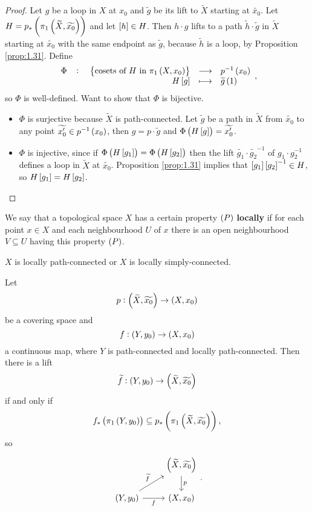 \begin{proof}
Let $ g $ be a loop in $ X $ at $ x_0 $ and $ \widetilde{g} $ be its lift to $ \widetilde{X} $ starting at $ \widetilde{x_0} $. Let $ H = p_*\br{\pi_1\br{\widetilde{X}, \widetilde{x_0}}} $ and let $ \sbr{h} \in H $. Then $ h \cdot g $ lifts to a path $ \widetilde{h} \cdot \widetilde{g} $ in $ \widetilde{X} $ starting at $ \widetilde{x_0} $ with the same endpoint as $ \widetilde{g} $, because $ \widetilde{h} $ is a loop, by Proposition \ref{prop:1.31}. Define
$$ \function[\Phi]{\cbr{\text{cosets of} \ H \ \text{in} \ \pi_1\br{X, x_0}}}{p^{-1}\br{x_0}}{H\sbr{g}}{\widetilde{g}\br{1}}, $$
so $ \Phi $ is well-defined. Want to show that $ \Phi $ is bijective.
\begin{itemize}
\item $ \Phi $ is surjective because $ \widetilde{X} $ is path-connected. Let $ \widetilde{g} $ be a path in $ \widetilde{X} $ from $ \widetilde{x_0} $ to any point $ \widetilde{x_0'} \in p^{-1}\br{x_0} $, then $ g = p \cdot \widetilde{g} $ and $ \Phi\br{H\sbr{g}} = \widetilde{x_0'} $.
\item $ \Phi $ is injective, since if $ \Phi\br{H\sbr{g_1}} = \Phi\br{H\sbr{g_2}} $ then the lift $ \widetilde{g_1} \cdot \widetilde{g_2}^{-1} $ of $ g_1 \cdot g_2^{-1} $ defines a loop in $ \widetilde{X} $ at $ \widetilde{x_0} $. Proposition \ref{prop:1.31} implies that $ \sbr{g_1}\sbr{g_2}^{-1} \in H $, so $ H\sbr{g_1} = H\sbr{g_2} $.
\end{itemize}
\end{proof}

We say that a topological space $ X $ has a certain property $ \br{P} $ \textbf{locally} if for each point $ x \in X $ and each neighbourhood $ U $ of $ x $ there is an open neighbourhood $ V \subseteq U $ having this property $ \br{P} $.

\begin{example*}
$ X $ is locally path-connected or $ X $ is locally simply-connected.
\end{example*}

\begin{proposition}
\label{prop:1.33}
Let
$$ p : \br{\widetilde{X}, \widetilde{x_0}} \to \br{X, x_0} $$
be a covering space and
$$ f : \br{Y, y_0} \to \br{X, x_0} $$
a continuous map, where $ Y $ is path-connected and locally path-connected. Then there is a lift
$$ \widetilde{f} : \br{Y, y_0} \to \br{\widetilde{X}, \widetilde{x_0}} $$
if and only if
$$ f_*\br{\pi_1\br{Y, y_0}} \subseteq p_*\br{\pi_1\br{\widetilde{X}, \widetilde{x_0}}}, $$
so
$$
\begin{tikzcd}
& \br{\widetilde{X}, \widetilde{x_0}} \arrow{d}{p} \\
\br{Y, y_0} \arrow{ur}{\widetilde{f}} \arrow[swap]{r}{f} & \br{X, x_0}
\end{tikzcd}.
$$
\end{proposition}

